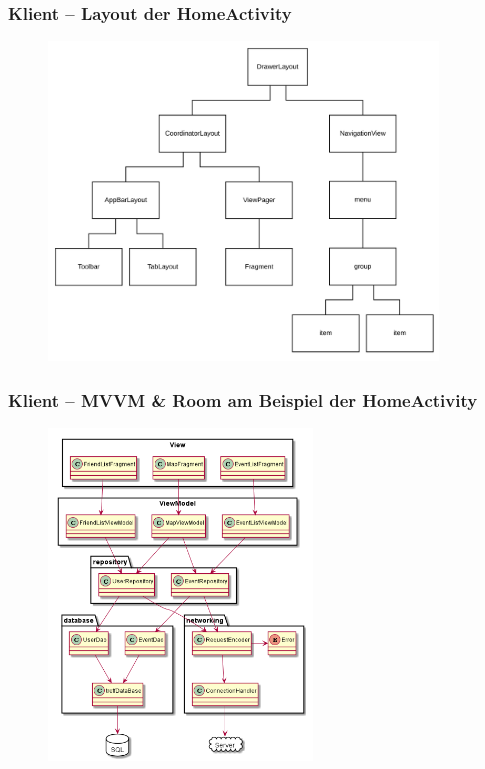 \documentclass[aspectratio=1610]{beamer}
\begin{document}
    \begin{frame}[plain]
        \frametitle{\textbf{Klient} -- Layout der HomeActivity}
        \begin{figure}[!htb]
            \centering
            \includegraphics[height = 240pt]{images/activity-home-layout.png}
        \end{figure}
    \end{frame}

	\begin{frame}[plain]
        \frametitle{\textbf{Klient} -- MVVM \& Room am Beispiel der HomeActivity}
        \begin{figure}[!htb]
            \centering
            \includegraphics[height = 250pt]{images/database.png}
        \end{figure}
	\end{frame}

\end{document}
